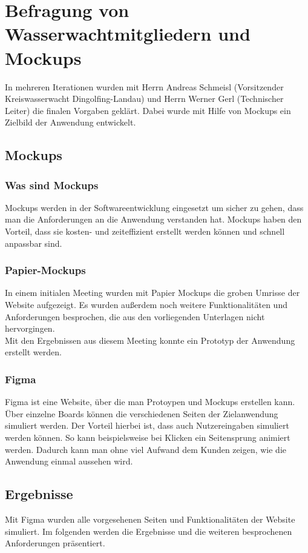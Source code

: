 \documentclass[fontsize=12pt,openright,oneside,paper=a4,BCOR=1cm]{scrbook}
\begin{document}
\section{Befragung von Wasserwachtmitgliedern und Mockups}
In mehreren Iterationen wurden mit Herrn Andreas Schmeisl (Vorsitzender Kreiswasserwacht Dingolfing-Landau) und Herrn Werner Gerl (Technischer Leiter) die finalen Vorgaben geklärt. Dabei wurde mit Hilfe von Mockups ein Zielbild der Anwendung entwickelt. 
\subsection{Mockups}
\subsubsection{Was sind Mockups}
Mockups werden in der Softwareentwicklung eingesetzt um sicher zu gehen, dass man die Anforderungen an die Anwendung verstanden hat. Mockups haben den Vorteil, dass sie kosten- und zeiteffizient erstellt werden können und schnell anpassbar sind.

\subsubsection{Papier-Mockups}
In einem initialen Meeting wurden mit Papier Mockups die groben Umrisse der Website aufgezeigt. Es wurden außerdem noch weitere Funktionalitäten und Anforderungen besprochen, die aus den vorliegenden Unterlagen nicht hervorgingen. \\
Mit den Ergebnissen aus diesem Meeting konnte ein Prototyp der Anwendung erstellt werden.


\subsubsection{Figma}
Figma ist eine Website, über die man Protoypen und Mockups erstellen kann. Über einzelne Boards können die verschiedenen Seiten der Zielanwendung simuliert werden. Der Vorteil hierbei ist, dass auch Nutzereingaben simuliert werden können. So kann beispielsweise bei Klicken ein Seitensprung animiert werden. Dadurch kann man ohne viel Aufwand dem Kunden zeigen, wie die Anwendung einmal aussehen wird. 

\subsection{Ergebnisse}
Mit Figma wurden alle vorgesehenen Seiten und Funktionalitäten der Website simuliert. Im folgenden werden die Ergebnisse und die weiteren besprochenen Anforderungen präsentiert. \\
\end{document}
